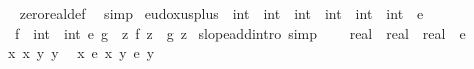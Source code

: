 \begin{isabellebody}
\isadelimproof
\ %
\endisadelimproof
%
\isatagproof
{}\isamarkupfalse%
\ zero{\isacharunderscore}{\kern0pt}real{\isacharunderscore}{\kern0pt}def\ \isamarkupfalse%
\ simp%
\endisatagproof
{\isafoldproof}%
%
\isadelimproof
%
\endisadelimproof
\isanewline
\isanewline
{}\isamarkupfalse%
\ eudoxus{\isacharunderscore}{\kern0pt}plus\ {\isacharcolon}{\kern0pt}{\isacharcolon}{\kern0pt}\ {\isachardoublequoteopen}{\isacharparenleft}{\kern0pt}int\ {\isasymRightarrow}\ int{\isacharparenright}{\kern0pt}\ {\isasymRightarrow}\ {\isacharparenleft}{\kern0pt}int\ {\isasymRightarrow}\ int{\isacharparenright}{\kern0pt}\ {\isasymRightarrow}\ {\isacharparenleft}{\kern0pt}int\ {\isasymRightarrow}\ int{\isacharparenright}{\kern0pt}{\isachardoublequoteclose}\ {\isacharparenleft}{\kern0pt}\ {\isachardoublequoteopen}{\isacharplus}{\kern0pt}\isactrlsub e{\isachardoublequoteclose}\ {}{}{\isacharparenright}{\kern0pt}\ \isanewline
\ \ {\isachardoublequoteopen}{\isacharparenleft}{\kern0pt}f\ {\isacharcolon}{\kern0pt}{\isacharcolon}{\kern0pt}\ int\ {\isasymRightarrow}\ int{\isacharparenright}{\kern0pt}\ {\isacharplus}{\kern0pt}\isactrlsub e\ g\ {\isacharequal}{\kern0pt}\ {\isacharparenleft}{\kern0pt}{\isasymlambda}z{\isachardot}{\kern0pt}\ f\ z\ {\isacharplus}{\kern0pt}\ g\ z{\isacharparenright}{\kern0pt}{\isachardoublequoteclose}\isanewline
\isanewline
{}\isamarkupfalse%
\ slope{\isacharunderscore}{\kern0pt}add{\isacharbrackleft}{\kern0pt}intro{\isacharcomma}{\kern0pt}\ simp{\isacharbrackright}{\kern0pt}\isanewline
\isanewline
{}\isamarkupfalse%
\isanewline
\ \ {\isachardoublequoteopen}{\isacharparenleft}{\kern0pt}{\isacharplus}{\kern0pt}{\isacharparenright}{\kern0pt}\ {\isacharcolon}{\kern0pt}{\isacharcolon}{\kern0pt}\ {\isacharparenleft}{\kern0pt}real\ {\isasymRightarrow}\ real\ {\isasymRightarrow}\ real{\isacharparenright}{\kern0pt}{\isachardoublequoteclose}\ \ {\isachardoublequoteopen}{\isacharparenleft}{\kern0pt}{\isacharplus}{\kern0pt}\isactrlsub e{\isacharparenright}{\kern0pt}{\isachardoublequoteclose}\ \isanewline
%
\isadelimproof
%
\endisadelimproof
%
\isatagproof
{}\isamarkupfalse%
\ {\isacharminus}{\kern0pt}\isanewline
\ \ \isamarkupfalse%
\ x\ x{\isacharprime}{\kern0pt}\ y\ y{\isacharprime}{\kern0pt}\ \isamarkupfalse%
\ {\isachardoublequoteopen}x\ {\isasymsim}\isactrlsub e\ x{\isacharprime}{\kern0pt}{\isachardoublequoteclose}\ {\isachardoublequoteopen}y\ {\isasymsim}\isactrlsub e\ y{\isacharprime}{\kern0pt}{\isachardoublequoteclose}\isanewline

\end{isabellebody}

